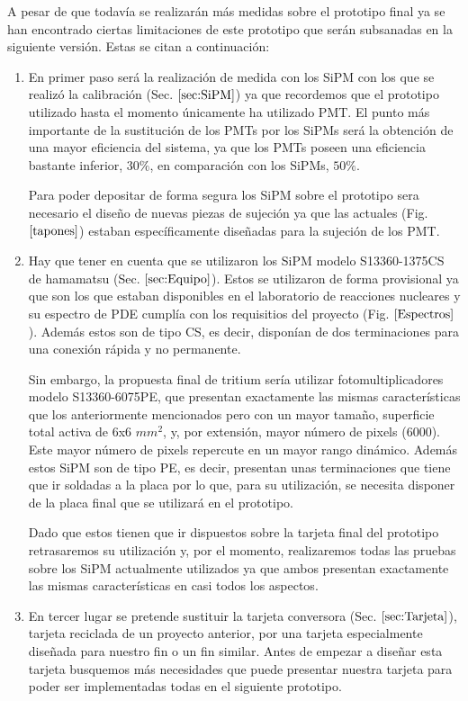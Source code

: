 A pesar de que todavía se realizarán más medidas sobre el prototipo final ya se han encontrado ciertas limitaciones de este prototipo que serán subsanadas  en la siguiente versión. Estas se citan a continuación:
\begin{enumerate}
\item{} En primer paso será la realización de medida con los SiPM con los que se realizó la calibración (Sec. $\ref{sec:SiPM}$) ya que recordemos que el prototipo utilizado hasta el momento únicamente ha utilizado PMT. El punto más importante de la sustitución de los PMTs por los SiPMs será la obtención de una mayor eficiencia del sistema, ya que los PMTs poseen una eficiencia bastante inferior, $30\%$, en comparación con los SiPMs, $50\%$.

Para poder depositar de forma segura los SiPM sobre el prototipo sera necesario el diseño de nuevas piezas de sujeción ya que las actuales (Fig. $\ref{tapones}$) estaban específicamente diseñadas para la sujeción de los PMT.

\item{} Hay que tener en cuenta que se utilizaron los SiPM modelo S13360-1375CS de hamamatsu (Sec. $\ref{sec:Equipo}$). Estos se utilizaron de forma provisional ya que son los que estaban disponibles en el laboratorio de reacciones nucleares y su espectro de PDE cumplía con los requisitios del proyecto (Fig. $\ref{Espectros}$). Además estos son de tipo CS, es decir, disponían de dos terminaciones para una conexión rápida y no permanente. 

Sin embargo, la propuesta final de tritium sería utilizar fotomultiplicadores modelo S13360-6075PE,  que presentan exactamente las mismas características que los anteriormente mencionados pero con un mayor tamaño, superficie total activa de 6x6 $mm^2$, y, por extensión, mayor número de pixels (6000). Este mayor número de pixels repercute en un mayor rango dinámico. Además estos SiPM son de tipo PE, es decir, presentan unas terminaciones que tiene que ir soldadas a la placa por lo que, para su utilización, se necesita disponer de la placa final que se utilizará en el prototipo. 

Dado que estos tienen que ir dispuestos sobre la tarjeta final del prototipo retrasaremos su utilización y, por el momento, realizaremos todas las pruebas sobre los SiPM actualmente utilizados ya que ambos presentan exactamente las mismas características en casi todos los aspectos.

\item{} En tercer lugar se pretende sustituir la tarjeta conversora (Sec. $\ref{sec:Tarjeta}$), tarjeta reciclada de un proyecto anterior, por una tarjeta especialmente diseñada para nuestro fin o un fin similar. Antes de empezar a diseñar esta tarjeta busquemos más necesidades que puede presentar nuestra tarjeta para poder ser implementadas todas en el siguiente prototipo.


\end{enumerate}
